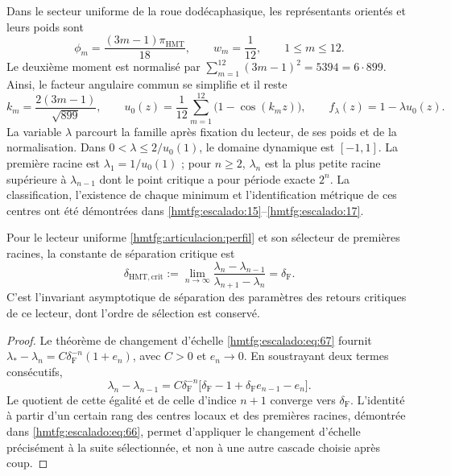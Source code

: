 Dans le secteur uniforme de la roue dodécaphasique, les représentants
orientés et leurs poids sont
\[
 \phi_m=\frac{(3m-1)\pi_{\mathrm{HMT}}}{18},\qquad
 w_m=\frac1{12},\qquad 1\le m\le12.
\]
Le deuxième moment est normalisé par
\(\sum_{m=1}^{12}(3m-1)^2=5394=6\cdot899\).
Ainsi, le facteur angulaire commun se simplifie et il reste
\begin{equation}
 k_m=\frac{2(3m-1)}{\sqrt{899}},\qquad
 u_0(z)=\frac1{12}\sum_{m=1}^{12}\bigl(1-\cos(k_mz)\bigr),
 \qquad f_\lambda(z)=1-\lambda u_0(z).
 \label{hmtfg:articulacion:perfil}
\end{equation}
La variable \(\lambda\) parcourt la famille après fixation du
lecteur, de ses poids et de la normalisation. Dans
\(0<\lambda\le2/u_0(1)\), le domaine dynamique est \([-1,1]\).
La première racine est \(\lambda_1=1/u_0(1)\) ; pour \(n\ge2\),
\(\lambda_n\) est la plus petite racine supérieure à \(\lambda_{n-1}\)
dont le point critique a pour période exacte \(2^n\).
La classification, l’existence de chaque minimum et l’identification
métrique de ces centres ont été démontrées dans
\ref{hmtfg:escalado:15}--\ref{hmtfg:escalado:17}.

\begin{proposition}
\label{hmtfg:articulacion:delta}
Pour le lecteur uniforme \eqref{hmtfg:articulacion:perfil} et son sélecteur
de premières racines, la constante de séparation critique est
\begin{equation}
 \delta_{\mathrm{HMT,crit}}
 :=\lim_{n\to\infty}
 \frac{\lambda_n-\lambda_{n-1}}{\lambda_{n+1}-\lambda_n}
 =\delta_{\mathrm F}.
 \label{hmtfg:articulacion:limite}
\end{equation}
C’est l’invariant asymptotique de séparation des paramètres des retours
critiques de ce lecteur, dont l’ordre de sélection est conservé.
\end{proposition}
\begin{proof}
Le théorème de changement d’échelle \eqref{hmtfg:escalado:eq:67} fournit
\(\lambda_*-\lambda_n=C\delta_{\mathrm F}^{-n}(1+e_n)\),
avec \(C>0\) et \(e_n\to0\). En soustrayant deux termes consécutifs,
\[
 \lambda_n-\lambda_{n-1}
 =C\delta_{\mathrm F}^{-n}
   \bigl[\delta_{\mathrm F}-1+
          \delta_{\mathrm F}e_{n-1}-e_n\bigr].
\]
Le quotient de cette égalité et de celle d’indice \(n+1\) converge vers
\(\delta_{\mathrm F}\). L’identité à partir d’un certain rang des centres locaux
et des premières racines, démontrée dans
\eqref{hmtfg:escalado:eq:66}, permet d’appliquer le changement d’échelle précisément
à la suite sélectionnée, et non à une autre cascade choisie après coup.
\end{proof}

